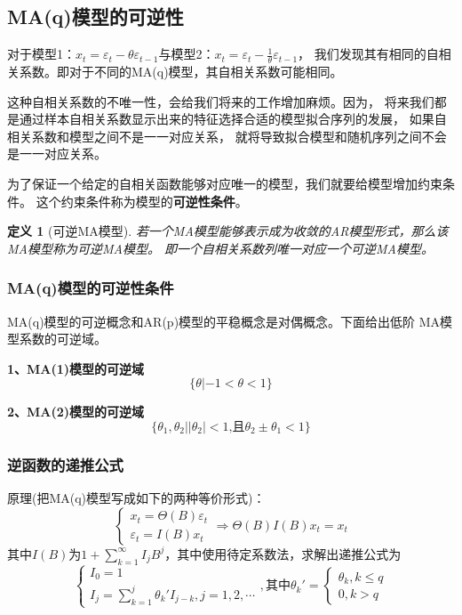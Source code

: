 \documentclass[12pt, a4paper, oneside]{ctexbook}
\newtheorem{definition}[theorem]{定义}
\begin{document}
\subsection{MA(q)模型的可逆性}
对于模型1：$x_t=\varepsilon_t-\theta\varepsilon_{t-1}$与模型2：$x_t=\varepsilon_t-\frac{1}{\theta}\varepsilon_{t-1}$，
我们发现其有相同的自相关系数。即对于不同的MA(q)模型，其自相关系数可能相同。

这种自相关系数的不唯一性，会给我们将来的工作增加麻烦。因为，
将来我们都是通过样本自相关系数显示出来的特征选择合适的模型拟合序列的发展，
如果自相关系数和模型之间不是一一对应关系，
就将导致拟合模型和随机序列之间不会是一一对应关系。

为了保证一个给定的自相关函数能够对应唯一的模型，我们就要给模型增加约束条件。
这个约束条件称为模型的\textbf{可逆性条件}。

\begin{definition}[可逆MA模型]
    若一个MA模型能够表示成为收敛的AR模型形式，那么该MA模型称为可逆MA模型。
    即一个自相关系数列唯一对应一个可逆MA模型。
\end{definition}

\subsubsection{MA(q)模型的可逆性条件}
MA(q)模型的可逆概念和AR(p)模型的平稳概念是对偶概念。下面给出低阶
MA模型系数的可逆域。

\textbf{1、MA(1)模型的可逆域}
\begin{equation*}
    \{\theta|-1<\theta<1\}
\end{equation*}

\textbf{2、MA(2)模型的可逆域}
\begin{equation*}
    \{\theta_1,\theta_2||\theta_2|<1\text{,且}
    \theta_2\pm\theta_1<1\}
\end{equation*}

\subsubsection{逆函数的递推公式}
原理(把MA(q)模型写成如下的两种等价形式)：
\begin{equation*}
    \begin{cases}x_t=\Theta(B)\varepsilon_t \\
        \varepsilon_t=I(B)x_t
    \end{cases}
    \Rightarrow\Theta(B)I(B)x_t=x_t
\end{equation*}
其中$I(B)$为$1+\sum_{k=1}^{\infty}I_jB^j$，其中使用待定系数法，求解出递推公式为
\begin{equation}\label{eq3.24}
    \begin{cases}
        I_0=1 \\
        I_j=\sum_{k=1}^j\theta_k'I_{j-k},j=1,2,\cdots
    \end{cases}
    ,\text{其中}\theta_k'=
    \begin{cases}
        \theta_k,k\le q \\
        0,k>q
    \end{cases}
\end{equation}
\end{document}
